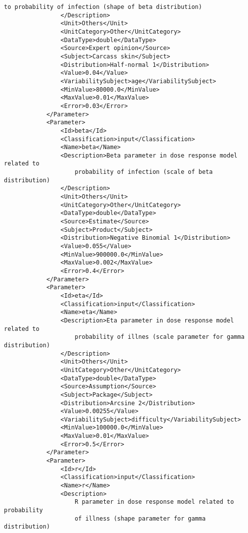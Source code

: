 \begin{lstlisting}[language=RAKIP, caption={Example of GenericModel}]
                    to probability of infection (shape of beta distribution)
                </Description>
                <Unit>Others</Unit>
                <UnitCategory>Other</UnitCategory>
                <DataType>double</DataType>
                <Source>Expert opinion</Source>
                <Subject>Carcass skin</Subject>
                <Distribution>Half-normal 1</Distribution>
                <Value>0.04</Value>
                <VariabilitySubject>age</VariabilitySubject>
                <MinValue>80000.0</MinValue>
                <MaxValue>0.01</MaxValue>
                <Error>0.03</Error>
            </Parameter>
            <Parameter>
                <Id>beta</Id>
                <Classification>input</Classification>
                <Name>beta</Name>
                <Description>Beta parameter in dose response model related to
                    probability of infection (scale of beta distribution)
                </Description>
                <Unit>Others</Unit>
                <UnitCategory>Other</UnitCategory>
                <DataType>double</DataType>
                <Source>Estimate</Source>
                <Subject>Product</Subject>
                <Distribution>Negative Binomial 1</Distribution>
                <Value>0.055</Value>
                <MinValue>900000.0</MinValue>
                <MaxValue>0.002</MaxValue>
                <Error>0.4</Error>
            </Parameter>
            <Parameter>
                <Id>eta</Id>
                <Classification>input</Classification>
                <Name>eta</Name>
                <Description>Eta parameter in dose response model related to
                    probability of illnes (scale parameter for gamma distribution)
                </Description>
                <Unit>Others</Unit>
                <UnitCategory>Other</UnitCategory>
                <DataType>double</DataType>
                <Source>Assumption</Source>
                <Subject>Package</Subject>
                <Distribution>Arcsine 2</Distribution>
                <Value>0.00255</Value>
                <VariabilitySubject>difficulty</VariabilitySubject>
                <MinValue>100000.0</MinValue>
                <MaxValue>0.01</MaxValue>
                <Error>0.5</Error>
            </Parameter>
            <Parameter>
                <Id>r</Id>
                <Classification>input</Classification>
                <Name>r</Name>
                <Description>
                    R parameter in dose response model related to probability
                    of illness (shape parameter for gamma distribution)

\end{lstlisting}
